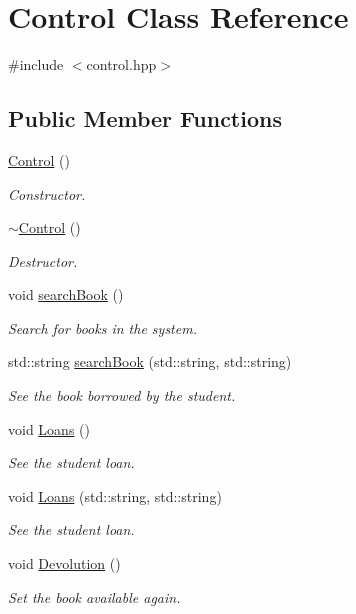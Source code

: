 \hypertarget{classControl}{}\section{Control Class Reference}
\label{classControl}


{\ttfamily \#include $<$control.\+hpp$>$}

\subsection*{Public Member Functions}
\begin{DoxyCompactItemize}
\item 
\hyperlink{classControl_aa730aeda4517f40bc48ba1e46ebded77}{Control} ()
\begin{DoxyCompactList}\small\item\em Constructor. \end{DoxyCompactList}\item 
\hyperlink{classControl_aedda1328c4f8b8d49bca8f0812d3bfd1}{$\sim$\+Control} ()
\begin{DoxyCompactList}\small\item\em Destructor. \end{DoxyCompactList}\item 
void \hyperlink{classControl_a8b6c2e30e71b54786b3ec01e8524076f}{search\+Book} ()
\begin{DoxyCompactList}\small\item\em Search for books in the system. \end{DoxyCompactList}\item 
std\+::string \hyperlink{classControl_a7719518366f488614467555e53a6d0c2}{search\+Book} (std\+::string, std\+::string)
\begin{DoxyCompactList}\small\item\em See the book borrowed by the student. \end{DoxyCompactList}\item 
void \hyperlink{classControl_ad413782c762539562d2ff9401a54eab3}{Loans} ()
\begin{DoxyCompactList}\small\item\em See the student loan. \end{DoxyCompactList}\item 
void \hyperlink{classControl_a4e5343c4033003b873eac91e72c0f8f6}{Loans} (std\+::string, std\+::string)
\begin{DoxyCompactList}\small\item\em See the student loan. \end{DoxyCompactList}\item 
void \hyperlink{classControl_a855e5c015aef0ed0194d184f326439e3}{Devolution} ()
\begin{DoxyCompactList}\small\item\em Set the book available again. \end{DoxyCompactList}\end{DoxyCompactItemize}


